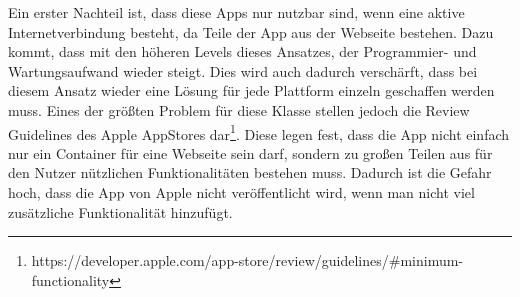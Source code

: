 Ein erster Nachteil ist, dass diese Apps nur nutzbar sind, wenn eine aktive Internetverbindung besteht, da Teile der App aus der Webseite bestehen. Dazu kommt, dass mit den höheren Levels dieses Ansatzes, der Programmier- und Wartungsaufwand wieder steigt. Dies wird auch dadurch verschärft, dass bei diesem Ansatz wieder eine Lösung für jede Plattform einzeln geschaffen werden muss. Eines der größten Problem für diese Klasse stellen jedoch die Review Guidelines des Apple AppStores dar\footnote{https://developer.apple.com/app-store/review/guidelines/\#minimum-functionality}. Diese legen fest, dass die App nicht einfach nur ein Container für eine Webseite sein darf, sondern zu großen Teilen aus für den Nutzer nützlichen Funktionalitäten bestehen muss. Dadurch ist die Gefahr hoch, dass die App von Apple nicht veröffentlicht wird, wenn man nicht viel zusätzliche Funktionalität hinzufügt. 